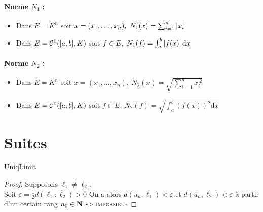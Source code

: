 		\paragraph{Norme $N_1$ :} 
		\begin{itemize}
			\item Dans $E=K^n$ soit $x=(x_1,\dots ,x_n) ,~ N_1(x) = \sum_{i=1}^n \left\vert x_i \right\vert $
			\item Dans $E={\mathcal{C}}^0([a,b],K)$ soit $f\in E,~N_1 (f) = \int_a^b \left\vert f(x) \right\vert \mathrm{d}x$
		\end{itemize}
		
		\paragraph{Norme $N_2$ :} 
		\begin{itemize}
			\item Dans $E=K^n$ soit $x=(x_1,\dots ,x_n) ,~ N_2(x) = \sqrt{\sum_{i=1}^n x_i^{~2}} $
			\item Dans $E={\mathcal{C}}^0([a,b],K)$ soit $f\in E,~N_2 (f) = \sqrt{\int_a^b \left( f(x)\right)^2 \mathrm{d}x}$
		\end{itemize} \medskip


\section{Suites}
		
		
		{UniqLimit}
		
		\begin{proof}
		Supposons $\ell_1\neq \ell_2$.\\
		Soit $\varepsilon = \frac{1}{2} d(\ell_1,\ell_2) >0$
		On a alors $d(u_n, \ell_1) < \varepsilon$ et $d(u_n, \ell_2) < \varepsilon$ à partir d'un certain rang $n_0 \in {\mathbf{N}}$ ->  \textsc{impossible}
		\end{proof} \medskip
		
